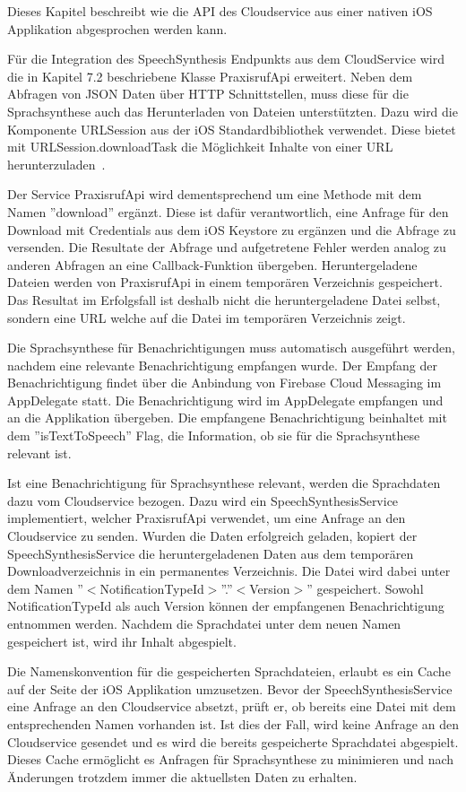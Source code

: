 Dieses Kapitel beschreibt wie die API des Cloudservice aus einer nativen iOS Applikation abgesprochen werden kann.

Für die Integration des SpeechSynthesis Endpunkts aus dem CloudService wird die in Kapitel 7.2 beschriebene Klasse PraxisrufApi erweitert.
Neben dem Abfragen von JSON Daten über HTTP Schnittstellen, muss diese für die Sprachsynthese auch das Herunterladen von Dateien unterstützten.
Dazu wird die Komponente URLSession aus der iOS Standardbibliothek verwendet.
Diese bietet mit URLSession.downloadTask die Möglichkeit Inhalte von einer URL herunterzuladen~\cite{ios_downloadtask}.

Der Service PraxisrufApi wird dementsprechend um eine Methode mit dem Namen ''download'' ergänzt.
Diese ist dafür verantwortlich, eine Anfrage für den Download mit Credentials aus dem iOS Keystore zu ergänzen und die Abfrage zu versenden.
Die Resultate der Abfrage und aufgetretene Fehler werden analog zu anderen Abfragen an eine Callback-Funktion übergeben.
Heruntergeladene Dateien werden von PraxisrufApi in einem temporären Verzeichnis gespeichert.
Das Resultat im Erfolgsfall ist deshalb nicht die heruntergeladene Datei selbst, sondern eine URL welche auf die Datei im temporären Verzeichnis zeigt.

Die Sprachsynthese für Benachrichtigungen muss automatisch ausgeführt werden, nachdem eine relevante Benachrichtigung empfangen wurde.
Der Empfang der Benachrichtigung findet über die Anbindung von Firebase Cloud Messaging im AppDelegate statt.
Die Benachrichtigung wird im AppDelegate empfangen und an die Applikation übergeben.
Die empfangene Benachrichtigung beinhaltet mit dem ''isTextToSpeech'' Flag, die Information, ob sie für die Sprachsynthese relevant ist.

Ist eine Benachrichtigung für Sprachsynthese relevant, werden die Sprachdaten dazu vom Cloudservice bezogen.
Dazu wird ein SpeechSynthesisService implementiert, welcher PraxisrufApi verwendet, um eine Anfrage an den Cloudservice zu senden.
Wurden die Daten erfolgreich geladen, kopiert der SpeechSynthesisService die heruntergeladenen Daten aus dem temporären Downloadverzeichnis in ein permanentes Verzeichnis.
Die Datei wird dabei unter dem Namen ''$<$NotificationTypeId$>$''.''$<$Version$>$'' gespeichert.
Sowohl NotificationTypeId als auch Version können der empfangenen Benachrichtigung entnommen werden.
Nachdem die Sprachdatei unter dem neuen Namen gespeichert ist, wird ihr Inhalt abgespielt.

Die Namenskonvention für die gespeicherten Sprachdateien, erlaubt es ein Cache auf der Seite der iOS Applikation umzusetzen.
Bevor der SpeechSynthesisService eine Anfrage an den Cloudservice absetzt, prüft er, ob bereits eine Datei mit dem entsprechenden Namen vorhanden ist.
Ist dies der Fall, wird keine Anfrage an den Cloudservice gesendet und es wird die bereits gespeicherte Sprachdatei abgespielt.
Dieses Cache ermöglicht es Anfragen für Sprachsynthese zu minimieren und nach Änderungen trotzdem immer die aktuellsten Daten zu erhalten.

